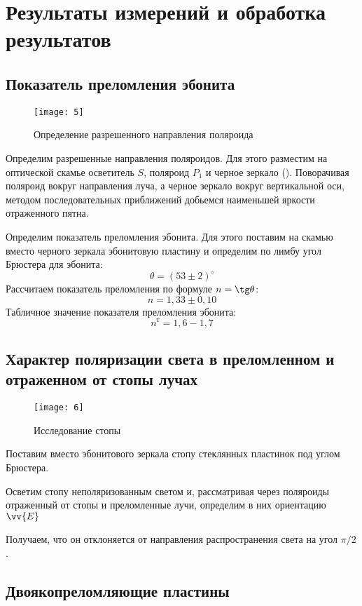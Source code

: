 \documentclass[a4paper, 12pt]{article}
\begin{document}
\section{Результаты измерений и обработка результатов}
\subsection*{Показатель преломления эбонита}

\begin{wrapfigure}{r}{0.4\linewidth}
    \texttt{[image: 5]}
    \caption{Определение разрешенного направления поляроида}
    \label{fig:5}
\end{wrapfigure}

Определим разрешенные направления поляроидов. Для этого разместим на
оптической скамье осветитель $S$, поляроид $P_1$ и черное зеркало
(). Поворачивая поляроид вокруг направления луча, а черное
зеркало вокруг вертикальной оси, методом последовательных приближений
добьемся наименьшей яркости отраженного пятна. 

Определим показатель преломления эбонита. Для этого поставим на скамью
вместо черного зеркала эбонитовую пластину и определим по лимбу угол
Брюстера для эбонита:
\[
    \theta = (53\pm 2)^\circ 
\]
Рассчитаем показатель преломления по формуле $n = \tg \theta$:
\[
    n = 1,33\pm 0,10
\]
Табличное значение показателя преломления эбонита:
\[
    n^\text{т} = 1,6 - 1,7
\]

\newpage
\subsection*{Характер поляризации света в преломленном и отраженном от
стопы лучах}

\begin{wrapfigure}[9]{l}{0.4\linewidth}
    \texttt{[image: 6]}
    \caption{Исследование стопы}
    \label{fig:6}
\end{wrapfigure}

Поставим вместо эбонитового зеркала  стопу стеклянных
пластинок под углом Брюстера.

Осветим стопу неполяризованным светом и, рассматривая через поляроиды
 отраженный от стопы и преломленные лучи, определим в них
ориентацию $\vv{E}$

Получаем, что он отклоняется от направления распространения света на
угол $\pi/2$.

\subsection*{Двоякопреломляющие пластины}
\end{document}
